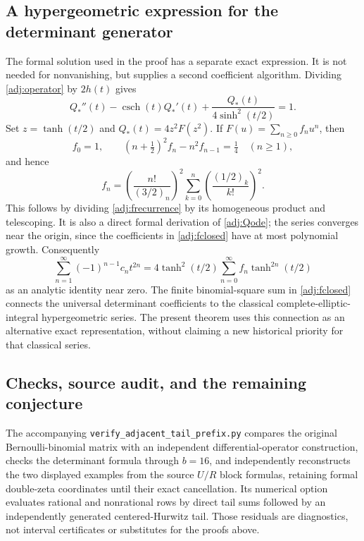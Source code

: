 \subsection{A hypergeometric expression for the determinant generator}

The formal solution used in the proof has a separate exact expression.
It is not needed for nonvanishing, but supplies a second coefficient
algorithm.  Dividing \eqref{adj:operator} by $2h(t)$ gives
\begin{equation}\label{adj:Qode}
 Q_*''(t)-\operatorname{csch}(t)Q_*'(t)
 +\frac{Q_*(t)}{4\sinh^2(t/2)}=1.
\end{equation}
Set $z=\tanh(t/2)$ and $Q_*(t)=4z^2F(z^2)$.  If
$F(u)=\sum_{n\ge0}f_nu^n$, then
\begin{equation}\label{adj:frecurrence}
 f_0=1,\qquad (n+\tfrac12)^2f_n-n^2f_{n-1}=\tfrac14
 \quad(n\ge1),
\end{equation}
and hence
\begin{equation}\label{adj:fclosed}
 f_n=\left(\frac{n!}{(3/2)_n}\right)^2
 \sum_{k=0}^{n}\left(\frac{(1/2)_k}{k!}\right)^2.
\end{equation}
This follows by dividing \eqref{adj:frecurrence} by its homogeneous
product and telescoping.  It is also a direct formal derivation of
\eqref{adj:Qode}; the series converges near the origin, since the
coefficients in \eqref{adj:fclosed} have at most polynomial growth.
Consequently
\begin{equation}\label{adj:detgenerator}
 \sum_{n=1}^{\infty}(-1)^{n-1}c_nt^{2n}
 =4\tanh^2(t/2)
 \sum_{n=0}^{\infty}f_n\tanh^{2n}(t/2)
\end{equation}
as an analytic identity near zero.  The finite binomial-square sum
in \eqref{adj:fclosed} connects the universal determinant
coefficients to the classical complete-elliptic-integral
hypergeometric series.  The present theorem uses this connection as
an alternative exact representation, without claiming a new
historical priority for that classical series.

\subsection{Checks, source audit, and the remaining conjecture}

The accompanying \texttt{verify\_adjacent\_tail\_prefix.py} compares
the original Bernoulli-binomial matrix with an independent
differential-operator construction, checks the determinant formula
through $b=16$, and independently reconstructs the two displayed
examples from the source $U/R$ block formulas, retaining formal
double-zeta coordinates until their exact cancellation.  Its
numerical option evaluates rational and nonrational rows by direct
tail sums followed by an independently generated centered-Hurwitz
tail.  Those residuals are diagnostics, not interval certificates
or substitutes for the proofs above.

